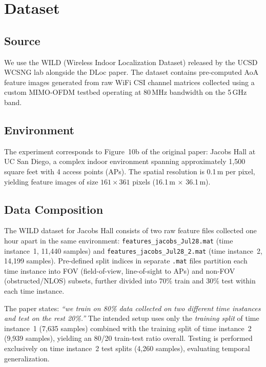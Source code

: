 \documentclass[12pt,a4paper]{article}
\begin{document}
\section{Dataset}

\subsection{Source}

We use the WILD (Wireless Indoor Localization Dataset) released by the UCSD WCSNG lab alongside the DLoc paper. The dataset contains pre-computed AoA feature images generated from raw WiFi CSI channel matrices collected using a custom MIMO-OFDM testbed operating at 80\,MHz bandwidth on the 5\,GHz band.

\subsection{Environment}

The experiment corresponds to Figure~10b of the original paper: Jacobs Hall at UC San Diego, a complex indoor environment spanning approximately 1,500 square feet with 4 access points (APs). The spatial resolution is 0.1\,m per pixel, yielding feature images of size $161 \times 361$ pixels (16.1\,m $\times$ 36.1\,m).

\subsection{Data Composition}

The WILD dataset for Jacobs Hall consists of two raw feature files collected one hour apart in the same environment: \texttt{features\_jacobs\_Jul28.mat} (time instance~1, 11{,}440 samples) and \texttt{features\_jacobs\_Jul28\_2.mat} (time instance~2, 14{,}199 samples). Pre-defined split indices in separate \texttt{.mat} files partition each time instance into FOV (field-of-view, line-of-sight to APs) and non-FOV (obstructed/NLOS) subsets, further divided into 70\% train and 30\% test within each time instance.

The paper states: \emph{``we train on 80\% data collected on two different time instances and test on the rest 20\%.''} The intended setup uses only the \emph{training split} of time instance~1 (7{,}635 samples) combined with the training split of time instance~2 (9{,}939 samples), yielding an 80/20 train-test ratio overall. Testing is performed exclusively on time instance~2 test splits (4{,}260 samples), evaluating temporal generalization.
\end{document}
